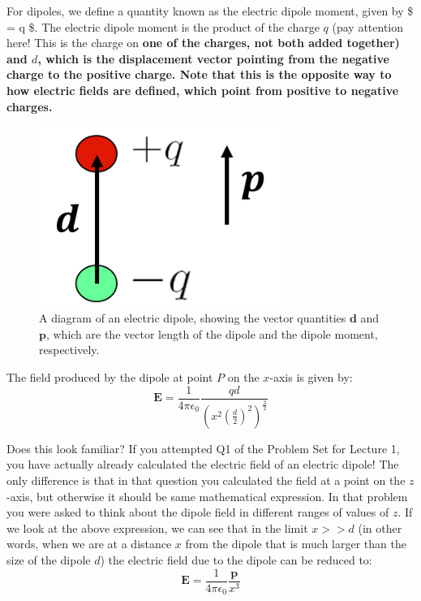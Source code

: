\documentclass[
  letterpaper,
  DIV=11,
  numbers=noendperiod]{scrreprt}
\begin{document}
For dipoles, we define a quantity known as the electric dipole moment,
given by \$ = q  \$. The electric
dipole moment is the product of the charge \(q\) (pay attention here!
This is the charge on
\bf{one of} the charges, not both added together) and $d$, which is the displacement vector pointing from the negative charge to the positive charge. Note that this is the opposite way to how electric fields are defined, which point from positive to negative charges.  

\begin{figure}[H]

{\centering \includegraphics[width=3.125in,height=\textheight]{Figures/dipole_moment.png}

}

\caption{A diagram of an electric dipole, showing the vector quantities
\(\mathrm{\mathbf{d}}\) and \(\mathrm{\mathbf{p}}\), which are the
vector length of the dipole and the dipole moment, respectively.}

\end{figure}%

The field produced by the dipole at point \(P\) on the \(x\)-axis is
given by: \[
\mathrm{\mathbf{E}}= \frac{1}{4\pi \epsilon_0} \frac{qd}{ \left( x^2 \left( \frac{d}{2} \right)^2 \right)^{\frac{3}{2}} }
\]

Does this look familiar? If you attempted Q1 of the Problem Set for
Lecture 1, you have actually already calculated the electric field of an
electric dipole! The only difference is that in that question you
calculated the field at a point on the \(z\)-axis, but otherwise it
should be same mathematical expression. In that problem you were asked
to think about the dipole field in different ranges of values of \(z\).
If we look at the above expression, we can see that in the limit
\(x >> d\) (in other words, when we are at a distance \(x\) from the
dipole that is much larger than the size of the dipole \(d\)) the
electric field due to the dipole can be reduced to: \[
\mathrm{\mathbf{E}}= \frac{1}{4 \pi \epsilon_0} \frac{\mathrm{\mathbf{p}}}{x^3}
\]
\end{document}
